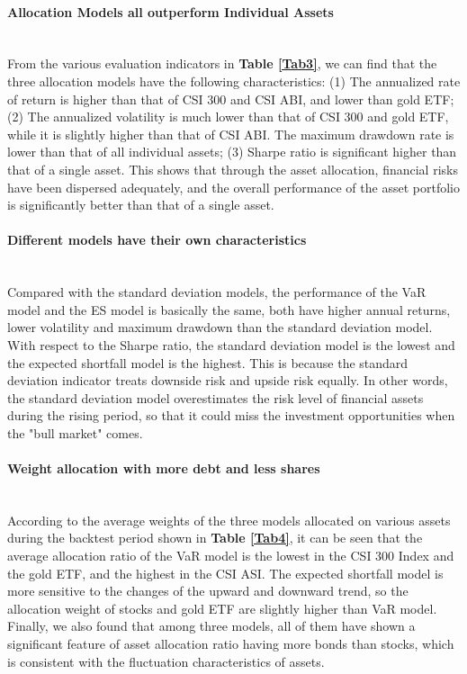 \paragraph{Allocation Models all outperform Individual Assets}\mbox{}\\
From the various evaluation indicators in \textbf{Table \ref{Tab3}}, we can find that the three allocation models have the following characteristics: (1) The annualized rate of return is higher than that of CSI 300 and CSI ABI, and lower than gold ETF; (2) The annualized volatility is much lower than that of CSI 300 and gold ETF, while it is slightly higher than that of CSI ABI. The maximum drawdown rate is lower than that of all individual assets; (3) Sharpe ratio is significant higher than that of a single asset.
This shows that through the asset allocation, financial risks have been dispersed adequately, and the overall performance of the asset portfolio is significantly better than that of a single asset.

\paragraph{Different models have their own characteristics}\mbox{}\\
Compared with the standard deviation models, the performance of the VaR model and the ES model is basically the same, both have higher annual returns, lower volatility and maximum drawdown than the standard deviation model. With respect to the Sharpe ratio, the standard deviation model is the lowest and the expected shortfall model is the highest. This is because the standard deviation indicator treats downside risk and upside risk equally. In other words, the standard deviation model overestimates the risk level of financial assets during the rising period, so that it could miss the investment opportunities when the "bull market" comes. 


\paragraph{Weight allocation with more debt and less shares}\mbox{}\\
According to the average weights of the three models allocated on various assets during the backtest period shown in \textbf{Table \ref{Tab4}}, it can be seen that the average allocation ratio of the VaR model is the lowest in the CSI 300 Index and the gold ETF, and the highest in the CSI ASI. The expected shortfall model is more sensitive to the changes of the upward and downward trend, so the allocation weight of stocks and gold ETF are slightly higher than VaR model. Finally, we also found that among three models, all of them have shown a significant feature of asset allocation ratio having more bonds than stocks, which is consistent with the fluctuation characteristics of assets.
